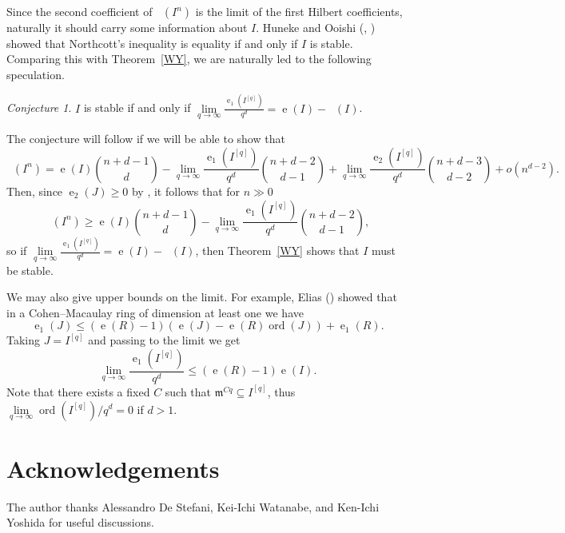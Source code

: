 \documentclass[12pt]{amsart}
\newcommand{\mf}[1]{\mathfrak #1}
\DeclareMathOperator{\eh}{e}
\DeclareMathOperator{\ehk}{e_{HK}}
\DeclareMathOperator{\ord}{ord}
\renewcommand{\frq}[1]{{#1}^{[q]}}
\theoremstyle{definition}
\theoremstyle{remark}
\newtheorem{conjecture}[theorem]{Conjecture}
\numberwithin{theorem}{section}
\numberwithin{equation}{section}
\begin{document}
Since the second coefficient of $\ehk(I^n)$ is the limit of the first Hilbert coefficients, naturally it should carry some information 
about $I$. 
Huneke and Ooishi (\cite[Theorem~2.1]{Huneke}, \cite[Theorem~3.3]{Ooishi}) showed that Northcott's inequality is equality 
if and only if $I$ is stable. Comparing this with Theorem~\ref{WY}, we are naturally led to the following speculation.

\begin{conjecture}
$I$ is stable if and only if 
$\lim\limits_{q \to \infty} \frac{\eh_1(\frq{I})}{q^d} = \eh(I) - \ehk(I)$.
\end{conjecture}

The conjecture will follow if we will be able to show that
\[
\ehk(I^n) = \eh(I) \binom{n + d -1}{d} - \lim_{q \to \infty} \frac{\eh_1(\frq{I})}{q^d} \binom{n + d - 2}{d - 1} +
\lim_{q \to \infty} \frac{\eh_2(\frq{I})}{q^d} \binom{n + d - 3}{d - 2} + o(n^{d - 2}).
\]
Then, since $\eh_2(J) \geq 0$ by \cite{Narita}, it follows that for $n \gg 0$
 \[
\ehk(I^n) \geq \eh(I) \binom{n + d -1}{d} - \lim_{q \to \infty} \frac{\eh_1(\frq{I})}{q^d} \binom{n + d - 2}{d - 1},
\]
so if $\lim\limits_{q \to \infty} \frac{\eh_1(\frq{I})}{q^d} = \eh(I) - \ehk(I)$, then Theorem~\ref{WY}
shows that $I$ must be stable.



We may also give upper bounds on the limit. For example, Elias (\cite[Proposition~2.1]{Elias})
showed that in a Cohen--Macaulay ring of dimension at least one we have
\[
\eh_1(J) \leq (\eh(R) - 1) (\eh(J) - \eh(R) \ord (J)) + \eh_1(R).
\]
Taking $J = \frq{I}$ and passing to the limit we get
\[
\lim_{q \to \infty} \frac{\eh_1(\frq{I})}{q^d} \leq (\eh(R) - 1)\eh(I).
\]
Note that there exists a fixed $C$ such that $\mf m^{Cq} \subseteq \frq{I}$, 
thus $\lim\limits_{q \to \infty } \ord (\frq{I})/q^d = 0$ if $d > 1$.



\section*{Acknowledgements}

The author thanks Alessandro De Stefani, Kei-Ichi Watanabe, and Ken-Ichi Yoshida for useful discussions. 



\end{document}
